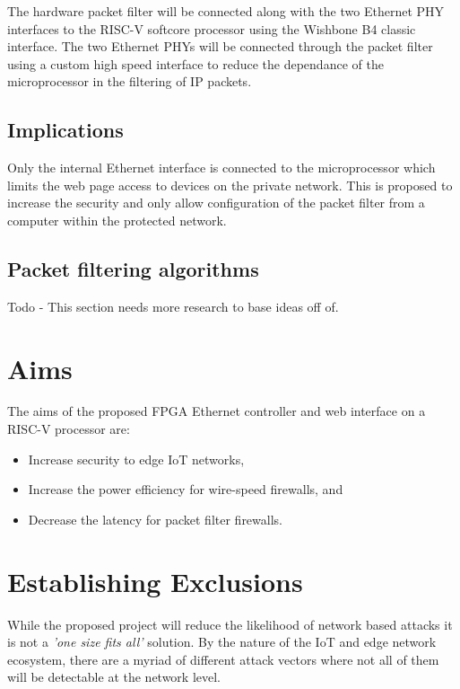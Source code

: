 \newpage

The hardware packet filter will be connected along with the two Ethernet PHY interfaces to the RISC-V softcore processor using the Wishbone B4 classic interface. 
The two Ethernet PHYs will be connected through the packet filter using a custom high speed interface to reduce the dependance of the microprocessor in the 
filtering of IP packets. 

\subsection{Implications}

Only the internal Ethernet interface is connected to the microprocessor which limits the web page access to devices on the private network. This is proposed to 
increase the security and only allow configuration of the packet filter from a computer within the protected network.


\subsection{Packet filtering algorithms}
Todo - This section needs more research to base ideas off of. 


\section{Aims}

The aims of the proposed FPGA Ethernet controller and web interface on a RISC-V processor are:

\begin{itemize}
    \item Increase security to edge IoT networks,
    \item Increase the power efficiency for wire-speed firewalls, and
    \item Decrease the latency for packet filter firewalls.
\end{itemize}



\section{Establishing Exclusions}

While the proposed project will reduce the likelihood of network based attacks it is not a \textit{'one size fits all'} solution. 
By the nature of the IoT and edge network ecosystem, there are a myriad of different attack vectors where not all of them will be detectable at the
network level.

